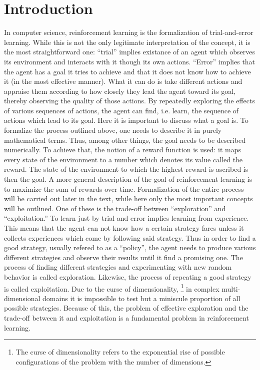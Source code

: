\chapter{Introduction}

In computer science, reinforcement learning is the formalization of trial-and-error learning.
While this is not the only legitimate interpretation of the concept, it is the most straightforward one:
``trial'' implies existance of an agent which observes its environment and interacts with it 
though its own actions.
``Error'' implies that the agent has a goal it tries to achieve and
that it does not know how to achieve it (in the most effective manner). 
What it can do is take different actions and appraise them
according to how closely they lead the agent toward its goal, thereby observing
the quality of those actions.
By repeatedly exploring the effects of various sequences of actions, the agent
can find, i.e. learn, the sequence of actions which lead to its goal.
Here it is important to discuss what a goal is.
To formalize the process outlined above, one needs to describe it
in purely mathematical terms.
Thus, among other things, the goal needs to be described numerically.
To achieve that, the notion of a reward function is used:
it maps every state of the environment to a number which denotes
its value called the reward. 
The state of the environment to which the highest reward is ascribed
is then the goal.
A more general description of the goal of reinforcement learning
is to maximize the sum of rewards over time.
Formalization of the entire process will be carried out later in the text,
while here only the most important concepts will be outlined.
One of these is the trade-off between ``exploration''
and ``exploitation.''
To learn just by trial and error implies learning from experience.
This means that the agent can not know 
how a certain strategy fares unless it collects experiences 
which come by following said strategy.
Thus in order to find a good strategy,
usually refered to as a ``policy'',
the agent needs to produce various different strategies and observe their results
until it find a promising one.
The process of finding different strategies and experimenting with new random
behavior is called exploration.
Likewise, the process of repeating a good strategy is called exploitation.
Due to the curse of dimensionality, 
\footnote{The curse of dimensionality refers to the exponential rise of 
possible configurations of the problem with the number of dimensions.}
in complex multi-dimensional domains it is impossible to test but a miniscule proportion 
of all possible strategies.
Because of this, the problem of effective exploration and the trade-off between
it and exploitation is a fundamental problem in reinforcement learning.

